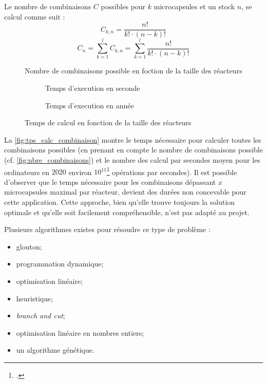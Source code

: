 Le nombre de combinaisons $C$ possibles pour $k$ \glspl{microcapsule} et un stock $n$, se calcul comme suit :
\begin{equation}
    C_{k,n} = \frac{n!}{k!\cdot(n-k)!}
    \label{eq:combinaison}
\end{equation}
\begin{equation}
    C_{n} = \sum_{k = 1}^{l} C_{k,n} = \sum_{k=1}^{l}\frac{n!}{k!\cdot (n-k)!}
    \label{eq:nbre_combinaisons}
\end{equation} 
\begin{figure}[H]
    \centering
    
    \caption{Nombre de combinaisons possible en foction de la taille des réacteurs}
    \label{fig:nbre_combinaisons}
\end{figure}

\begin{figure}[H]
    \centering
    \begin{subfigure}{0.5\textwidth}
        \centering
        
        \caption{Temps d'execution en seconde}
    \end{subfigure}\hfill
    \begin{subfigure}{0.5\textwidth}
        \centering
        
        \caption{Temps d'execution en année}
    \end{subfigure}
    \caption{Temps de calcul en fonction de la taille des réacteurs}
    \label{fig:tps_calc_combinaison}
\end{figure}
La \autoref{fig:tps_calc_combinaison} montre le temps nécessaire pour calculer toutes les combinaisons possibles (en prenant en compte le nombre de combinaisons possible (cf. \autoref{fig:nbre_combinaisons}) et le nombre des calcul par secondes moyen pour les ordinateurs en $2020$ environ $10^{11}$\footcite{petite_analyse_nbre_calculs_par_sec} opérations par secondes). Il est possible d'observer que le temps nécessaire pour les combinaisons dépassant $x$ \glspl{microcapsule} maximal par réacteur, devient des durées non concevable pour cette application.
Cette approche, bien qu'elle trouve toujours la solution optimale et qu'elle soit facilement compréhensible, n'est pas adapté au projet.

Plusieurs algorithmes existes pour résoudre ce type de problème : 
\begin{itemize}
    \item glouton;
    \item programmation dynamique;
    \item optimisation linéaire;
    \item heuristique;
    \item \textit{branch and cut};
    \item optimisation linéaire en nombres entiers;
    \item un algorithme génétique.
    \label{list:liste_algorithme}
\end{itemize}

